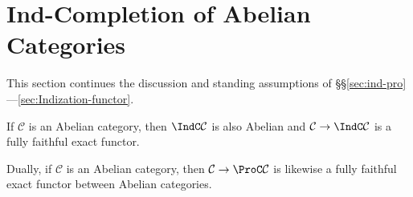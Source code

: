 
\section{Ind-Completion of Abelian Categories}\label{sec:Indization-Abel}
This section continues the discussion and standing assumptions of \S\S\ref{sec:ind-pro}---\ref{sec:Indization-functor}.

\begin{theorem}\label{prop:Ind-Abel}
	If $\mathcal{C}$ is an Abelian category, then $\IndC\mathcal{C}$ is also Abelian and $\mathcal{C}\to\IndC\mathcal{C}$ is a fully faithful exact functor.

	Dually, if $\mathcal{C}$ is an Abelian category, then $\mathcal{C}\to\ProC\mathcal{C}$ is likewise a fully faithful exact functor between Abelian categories.
\end{theorem}
